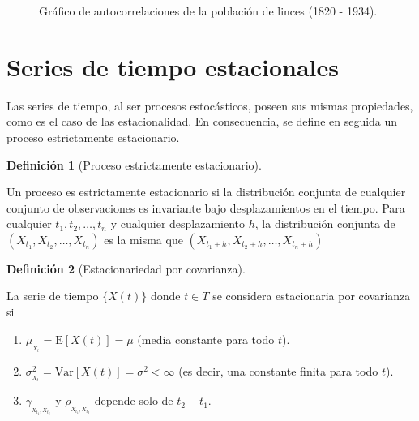 \documentclass[
  us-letterpaper,
]{scrreprt}
\theoremstyle{plain}
\theoremstyle{definition}
\newtheorem{definition}{Definición}[chapter]
\theoremstyle{definition}
\theoremstyle{remark}
\begin{document}
\begin{tcolorbox}
\begin{figure}[H]
\begin{minipage}{0.50\linewidth}
{}


\end{minipage}%

\caption{\label{fig-autoc}Gráfico de autocorrelaciones de la población
de linces (1820 - 1934).}

\end{figure}%

\end{tcolorbox}

\section{Series de tiempo estacionales}\label{sec-series-estacionales}

Las series de tiempo, al ser procesos estocásticos, poseen sus mismas
propiedades, como es el caso de las estacionalidad. En consecuencia, se
define en seguida un proceso estrictamente estacionario.

\begin{definition}[Proceso estrictamente
estacionario]\protect\hypertarget{def-pecreciente}{}\label{def-pecreciente}

Un proceso es estrictamente estacionario si la distribución conjunta de
cualquier conjunto de observaciones es invariante bajo desplazamientos
en el tiempo. Para cualquier \(t_1,t_2, \dots,t_n\) y cualquier
desplazamiento \(h\), la distribución conjunta de
\((X_{t_1},X_{t_2},\dots,X_{t_n})\) es la misma que
\((X_{t_1+h},X_{t_2+h},\dots,X_{t_n+h})\)

\end{definition}

\begin{definition}[Estacionariedad por
covarianza]\protect\hypertarget{def-estcov}{}\label{def-estcov}

La serie de tiempo \(\{X(t)\}\) donde \(t \in T\) se considera
estacionaria por covarianza si

\begin{enumerate}
\def\labelenumi{\roman{enumi}.}
\item
  \(\mu_{_{X_t}}=\mathrm E[X(t)] = \mu\) (media constante para todo
  \(t\)).
\item
  \(\sigma^2_{_{X_t}}=\mathrm{Var}[X(t)] = \sigma^2 < \infty\) (es
  decir, una constante finita para todo \(t\)).
\item
  \(\gamma_{_{X_{t_1},X_{t_2}}}\) y \(\rho_{_{X_{t_1},X_{t_2}}}\)
  depende solo de \(t_2 − t_1\).
\end{enumerate}

\end{definition}
\end{document}
